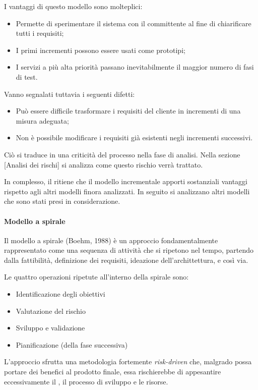 I vantaggi di questo modello sono molteplici:
\begin{itemize}
\item Permette di sperimentare il sistema con il committente al fine di chiarificare tutti i requisiti;
\item I primi incrementi possono essere usati come prototipi;
\item I servizi a più alta priorità passano inevitabilmente il maggior numero di fasi di test.
\end{itemize}

Vanno segnalati tuttavia i seguenti difetti:
\begin{itemize}
\item Può essere difficile trasformare i requisiti del cliente in incrementi di una misura adeguata;
\item Non è possibile modificare i requisiti già esistenti negli incrementi successivi.
\end{itemize}

Ciò si traduce in una criticità del processo nella fase di analisi. Nella sezione [Analisi dei rischi] si analizza come questo rischio verrà trattato.

In complesso, il  ritiene che il modello incrementale apporti sostanziali vantaggi rispetto agli altri modelli finora analizzati. In seguito si analizzano altri modelli che sono stati presi in considerazione.

			\paragraph{Modello a spirale}
			Il modello a spirale (Boehm, 1988) è un approccio fondamentalmente rappresentato come una sequenza di attività che si ripetono nel tempo, partendo dalla fattibilità, definizione dei requisiti, ideazione dell'archittettura, e così via.
			
			Le quattro operazioni ripetute all'interno della spirale sono:
\begin{itemize}
\item Identificazione degli obiettivi
\item Valutazione del rischio
\item Sviluppo e validazione
\item Pianificazione (della fase successiva)
\end{itemize}			 

L'approccio sfrutta una metodologia fortemente \textit{risk-driven} che, malgrado possa portare dei benefici al prodotto finale, essa rischierebbe di appesantire eccessivamente il , il processo di sviluppo e le risorse.
